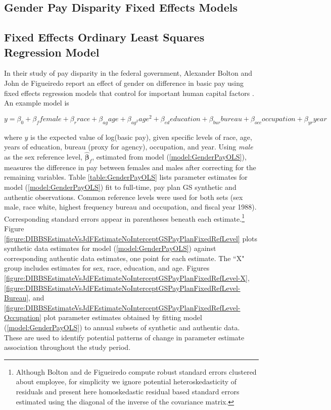 \documentclass[10pt, letterpaper]{article}
\newcommand{\mest}[1]{\hat{\bm{#1}}}
\begin{document}
\begin{spacing}{1.0}
\clearpage

\section{Gender Pay Disparity Fixed Effects Models}

\subsection{Fixed Effects Ordinary Least Squares Regression Model}

In their study of pay disparity in the federal government, Alexander Bolton and John de Figueiredo report an effect of gender on difference in basic pay using fixed effects regression models that control for important human capital factors \citep{BoltondeFigGenderPayGap2017}.  An example model is

\vspace{-10pt}
\begin{equation} y=\beta_0+\beta_ffemale+\beta_rrace+\beta_{ag}age+\beta_{ag^2}age^2+\beta_{ed}education+\beta_{bur}bureau+\beta_{occ}occupation+\beta_{yr}year
\label{model:GenderPayOLS}
\end{equation}

where $y$ is the expected value of log(basic pay), given specific levels of race, age, years of education, bureau (proxy for agency), occupation, and year.  Using \textit{male} as the sex reference level, $\mest{\beta}_f$, estimated from model (\ref{model:GenderPayOLS}), measures the difference in pay between females and males after correcting for the remaining variables.  Table \ref{table:GenderPayOLS} lists parameter estimates for model (\ref{model:GenderPayOLS}) fit to full-time, pay plan GS synthetic and authentic observations.  Common reference levels were used for both sets (sex male, race white, highest frequency bureau and occupation, and fiscal year 1988).  Corresponding standard errors appear in parentheses beneath each estimate.\footnote{Although Bolton and de Figueiredo compute robust standard errors clustered about employee, for simplicity we ignore potential heteroskedasticity of residuals and present here homoskedastic residual based standard errors estimated using the diagonal of the inverse of the covariance matrix.}  Figure \ref{figure:DIBBSEstimateVsJdFEstimateNoInterceptGSPayPlanFixedRefLevel} plots 
synthetic data estimates for model (\ref{model:GenderPayOLS}) against corresponding authentic data estimates, one point for each estimate.  The ``X" group includes estimates for sex, race, education, and age.  Figures \ref{figure:DIBBSEstimateVsJdFEstimateNoInterceptGSPayPlanFixedRefLevel-X}, \ref{figure:DIBBSEstimateVsJdFEstimateNoInterceptGSPayPlanFixedRefLevel-Bureau}, and \ref{figure:DIBBSEstimateVsJdFEstimateNoInterceptGSPayPlanFixedRefLevel-Occupation} plot parameter estimates obtained by fitting model (\ref{model:GenderPayOLS}) to annual subsets of synthetic and authentic data.  These are used to identify potential patterns of change in parameter estimate association throughout the study period.\\


\end{spacing}
\end{document}

